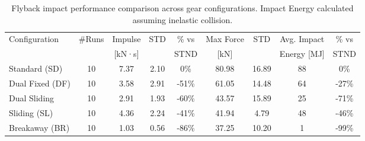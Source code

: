 \begin{table}[htb]
\centering
\scriptsize
\begin{tabular}{l|c|c|c|c|c|c|c|c}
\hline
Configuration & \#Runs & Impulse & STD & \% vs & Max Force & STD & Avg. Impact & \% vs \\
              &        & [kN·s]  &     & STND  & [kN]      &     & Energy [MJ] & STND \\
\hline
Standard (SD)  & 10 & 7.37 & 2.10 &   0\% & 80.98 & 16.89 &   88 &   0\% \\
Dual Fixed (DF) & 10 & 3.58 & 2.91 & -51\% & 61.05 & 14.48 &   64 & -27\% \\
Dual Sliding   & 10 & 2.91 & 1.93 & -60\% & 43.57 & 15.89 &   25 & -71\% \\
Sliding (SL)   & 10 & 4.36 & 2.24 & -41\% & 41.94 &  4.79 &   48 & -46\% \\
Breakaway (BR) & 10 & 1.03 & 0.56 & -86\% & 37.25 & 10.20 &    1 & -99\% \\
\hline
\end{tabular}
\caption{Flyback impact performance comparison across gear configurations. Impact Energy calculated assuming inelastic collision.}
\label{tab:flyback_results}
\end{table}